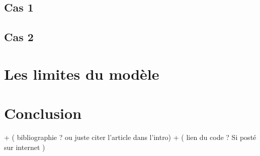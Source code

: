 \documentclass[a4paper,fleqn]{article}
\begin{document}
\subsection{Cas 1} 

\subsection{Cas 2} 

\section{Les limites du modèle}


\section{Conclusion} 

+ ( bibliographie ? ou juste citer l'article dans l'intro)
+ ( lien du code ? Si posté sur internet )
 







\end{document}
